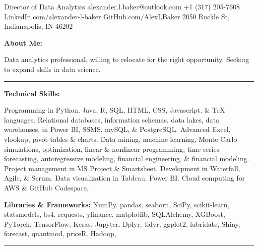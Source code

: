 \documentclass[letterpaper]{cream_class}
\begin{document}
       {Director of Data Analytics}
       {alexander.l.baker@outlook.com}
       {+1 (317) 205-7608}
       {LinkedIn.com/alexander-l-baker}
       {GitHub.com/AlexLBaker}
       {2050 Ruckle St, Indianapolis, IN 46202}

\noindent\textcolor{burgundy}{\textbf{\large About Me:}}

Data analytics professional, willing to relocate for the right opportunity. Seeking to expand skills in data science.

\vspace{6pt}
  \hrule
  \vspace{6pt}

\noindent\textcolor{burgundy}{\textbf{\large Technical Skills:}}

Programming in Python, Java, R, SQL, HTML, CSS, Javascript, \& TeX languages. Relational databases, information schemas, data lakes, data warehouses, in Power BI, SSMS, mySQL, \& PostgreSQL. Advanced Excel, vlookup, pivot tables \& charts. Data mining, machine learning, Monte Carlo simulations, optimization, linear \& nonlinear programming, time series forecasting, autoregressive modeling, financial engineering, \& financial modeling. Project management in MS Project \& Smartsheet. Development in Waterfall, Agile, \& Scrum. Data visualization in Tableau, Power BI. Cloud computing for AWS \& GitHub Codespace.

\textbf{Libraries \& Frameworks:} NumPy, pandas, seaborn, SciPy, scikit-learn, statsmodels, bs4, requests, yfinance, matplotlib, SQLAlchemy, XGBoost, PyTorch, TensorFlow, Keras, Jupyter. Dplyr, tidyr, ggplot2, lubridate, Shiny, forecast, quantmod, priceR. Hadoop,

\vspace{6pt}
  \hrule
  \vspace{6pt}
  
\end{document}
